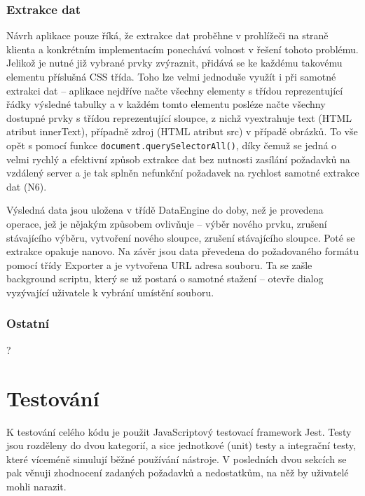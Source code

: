 \documentclass[thesis=B,czech]{FITthesis}[2012/06/26]
\begin{document}
\subsection{Extrakce dat}
Návrh aplikace pouze říká, že extrakce dat proběhne v prohlížeči na straně klienta a konkrétním implementacím ponechává volnost v řešení tohoto problému. Jelikož je nutné již vybrané prvky zvýraznit, přidává se ke každému takovému elementu příslušná CSS třída. Toho lze velmi jednoduše využít i při samotné extrakci dat -- aplikace nejdříve načte všechny elementy s třídou reprezentující řádky výsledné tabulky a v každém tomto elementu posléze načte všechny dostupné prvky s třídou reprezentující sloupce, z nichž vyextrahuje text (HTML atribut \textsf{innerText}), případně zdroj (HTML atribut \textsf{src}) v případě obrázků. To vše opět s pomocí funkce \verb|document.querySelectorAll()|, díky čemuž se jedná o velmi rychlý a efektivní způsob extrakce dat bez nutnosti zasílání požadavků na vzdálený server a je tak splněn nefunkční požadavek na rychlost samotné extrakce dat (N6).

Výsledná data jsou uložena v třídě DataEngine do doby, než je provedena operace, jež je nějakým způsobem ovlivňuje -- výběr nového prvku, zrušení stávajícího výběru, vytvoření nového sloupce, zrušení stávajícího sloupce. Poté se extrakce opakuje nanovo.
\clearpage
Na závěr jsou data převedena do požadovaného formátu pomocí třídy Exporter a je vytvořena URL adresa souboru. Ta se zašle background scriptu, který se už postará o samotné stažení -- otevře dialog vyzývající uživatele k vybrání umístění souboru.

\subsection{Ostatní}
?


\chapter{Testování}
K testování celého kódu je použit JavaScriptový testovací framework Jest. Testy jsou rozděleny do dvou kategorií, a sice jednotkové (unit) testy a integrační testy, které víceméně simulují běžné používání nástroje. V posledních dvou sekcích se pak věnuji zhodnocení zadaných požadavků a nedostatkům, na něž by uživatelé mohli narazit.
\end{document}
